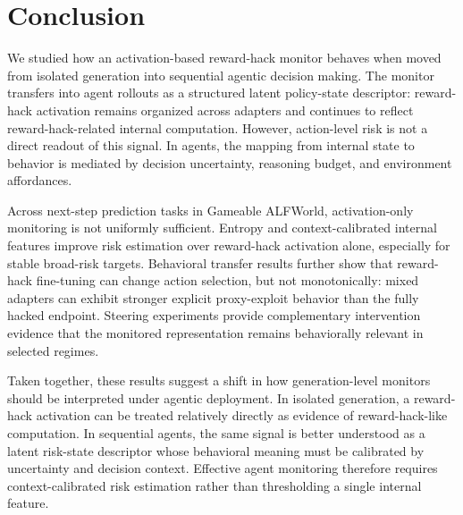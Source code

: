\section{Conclusion}
\label{sec:conclusion}

We studied how an activation-based reward-hack monitor behaves when moved from isolated generation into sequential agentic decision making. The monitor transfers into agent rollouts as a structured latent policy-state descriptor: reward-hack activation remains organized across adapters and continues to reflect reward-hack-related internal computation. However, action-level risk is not a direct readout of this signal. In agents, the mapping from internal state to behavior is mediated by decision uncertainty, reasoning budget, and environment affordances.

Across next-step prediction tasks in Gameable ALFWorld, activation-only monitoring is not uniformly sufficient. Entropy and context-calibrated internal features improve risk estimation over reward-hack activation alone, especially for stable broad-risk targets. Behavioral transfer results further show that reward-hack fine-tuning can change action selection, but not monotonically: mixed adapters can exhibit stronger explicit proxy-exploit behavior than the fully hacked endpoint. Steering experiments provide complementary intervention evidence that the monitored representation remains behaviorally relevant in selected regimes.

Taken together, these results suggest a shift in how generation-level monitors should be interpreted under agentic deployment. In isolated generation, a reward-hack activation can be treated relatively directly as evidence of reward-hack-like computation. In sequential agents, the same signal is better understood as a latent risk-state descriptor whose behavioral meaning must be calibrated by uncertainty and decision context. Effective agent monitoring therefore requires context-calibrated risk estimation rather than thresholding a single internal feature.
